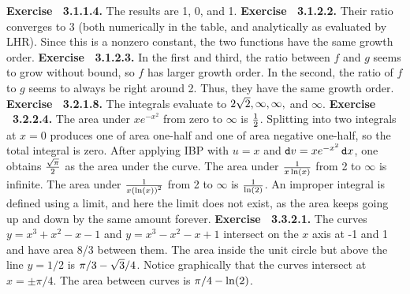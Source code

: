  {\noindent \protect \bf  Exercise ~3.1.1.4.} The results are 1, 0, and 1. \protect \newline  \protect \newline  
 {\noindent \protect \bf  Exercise ~3.1.2.2.} Their ratio converges to 3 (both numerically in the table, and analytically as evaluated by LHR). Since this is a nonzero constant, the two functions have the same growth order. \protect \newline  \protect \newline  
 {\noindent \protect \bf  Exercise ~3.1.2.3.} In the first and third, the ratio between $f$ and $g$ seems to grow without bound, so $f$ has larger growth order. In the second, the ratio of $f$ to $g$ seems to always be right around 2. Thus, they have the same growth order. \protect \newline  \protect \newline  
 {\noindent \protect \bf  Exercise ~3.2.1.8.} The integrals evaluate to $2\protect \sqrt  {2},\infty ,\infty ,$ and $\infty $. \protect \newline  \protect \newline  
 {\noindent \protect \bf  Exercise ~3.2.2.4.} \textbullet The area under $xe^{-x^2}$ from zero to $\infty $ is $\protect \frac  {1}{2}$. \textbullet Splitting into two integrals at $x=0$ produces one of area one-half and one of area negative one-half, so the total integral is zero. \textbullet After applying IBP with $u=x$ and $\mathop {}\protect \tmspace  -\thinmuskip {.1667em}\protect \mathtt  {d}v = xe^{-x^2}\mathop {}\protect \tmspace  -\thinmuskip {.1667em}\protect \mathtt  {d}x$, one obtains $\protect \frac  {\protect \sqrt  {\pi }}{2}$ as the area under the curve. \textbullet The area under $\protect \frac  {1}{x\protect \qopname  \relax o{ln}(x)}$ from 2 to $\infty $ is infinite. \textbullet The area under $\protect \frac  {1}{x\left (\protect \qopname  \relax o{ln}(x)\right )^2}$ from 2 to $\infty $ is $\protect \frac  {1}{\protect \qopname  \relax o{ln}(2)}$. \textbullet An improper integral is defined using a limit, and here the limit does not exist, as the area keeps going up and down by the same amount forever. \protect \newline  \protect \newline  
 {\noindent \protect \bf  Exercise ~3.3.2.1.} \textbullet The curves $y=x^3+x^2-x-1$ and $y=x^3-x^2-x+1$ intersect on the $x$ axis at -1 and 1 and have area 8/3 between them. \textbullet The area inside the unit circle but above the line $y=1/2$ is $\pi /3-\protect \sqrt  {3}/4$. \textbullet Notice graphically that the curves intersect at $x=\pm \pi /4$. The area between curves is $\pi /4-\protect \qopname  \relax o{ln}(2)$. \protect \newline  \protect \newline  
